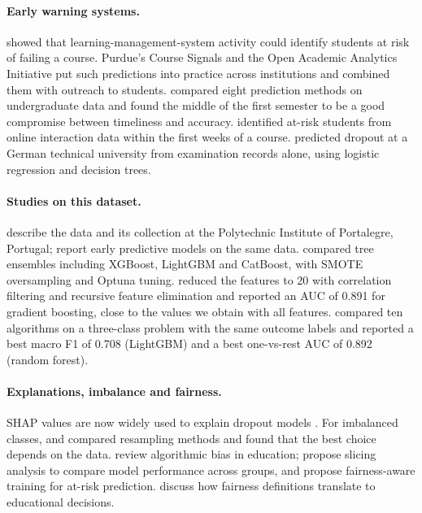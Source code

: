 \documentclass[11pt,a4paper]{article}
\begin{document}
\paragraph{Early warning systems.} \citet{macfadyen2010} showed that learning-management-system activity could identify students at risk of failing a course. Purdue's Course Signals \citep{arnold2012} and the Open Academic Analytics Initiative \citep{jayaprakash2014} put such predictions into practice across institutions and combined them with outreach to students. \citet{howard2018} compared eight prediction methods on undergraduate data and found the middle of the first semester to be a good compromise between timeliness and accuracy. \citet{akcapinar2019} identified at-risk students from online interaction data within the first weeks of a course. \citet{kemper2020} predicted dropout at a German technical university from examination records alone, using logistic regression and decision trees.

\paragraph{Studies on this dataset.} \citet{realinho2022} describe the data and its collection at the Polytechnic Institute of Portalegre, Portugal; \citet{martins2021} report early predictive models on the same data. \citet{villar2024} compared tree ensembles including XGBoost, LightGBM and CatBoost, with SMOTE oversampling and Optuna tuning. \citet{gu2026} reduced the features to 20 with correlation filtering and recursive feature elimination and reported an AUC of 0.891 for gradient boosting, close to the values we obtain with all features. \citet{vo2026} compared ten algorithms on a three-class problem with the same outcome labels and reported a best macro F1 of 0.708 (LightGBM) and a best one-vs-rest AUC of 0.892 (random forest).

\paragraph{Explanations, imbalance and fairness.} SHAP values \citep{lundberg2017,lundberg2020} are now widely used to explain dropout models \citep{nagy2024,krueger2023}. For imbalanced classes, \citet{wongvorachan2023} and \citet{mduma2023} compared resampling methods and found that the best choice depends on the data. \citet{baker2022} review algorithmic bias in education; \citet{gardner2019} propose slicing analysis to compare model performance across groups, and \citet{hu2020} propose fairness-aware training for at-risk prediction. \citet{kizilcec2022} discuss how fairness definitions translate to educational decisions.
\end{document}
